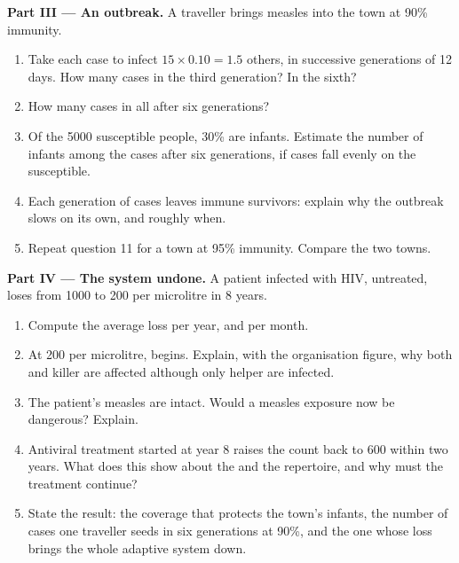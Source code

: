 \begin{problem}
\medskip
\noindent\textbf{Part III --- An outbreak.}
A traveller brings measles into the town at 90\% immunity.
\begin{enumerate}[resume]
  \item Take each case to infect $15 \times 0.10 = 1.5$ others, in
        successive generations of 12 days. How many cases in the
        third generation? In the sixth?
  \item How many cases in all after six generations?
  \item Of the 5000 susceptible people, 30\% are infants. Estimate the
        number of infants among the cases after six generations, if
        cases fall evenly on the susceptible.
  \item Each generation of cases leaves immune survivors: explain why
        the outbreak slows on its own, and roughly when.
  \item Repeat question 11 for a town at 95\% immunity. Compare the
        two towns.
\end{enumerate}

\medskip
\noindent\textbf{Part IV --- The system undone.}
A patient infected with HIV, untreated, loses  from
1000 to 200 per microlitre in 8 years.
\begin{enumerate}[resume]
  \item Compute the average loss per year, and per month.
  \item At 200 per microlitre,  begins. Explain, with the
        organisation figure, why both  and killer  are
        affected although only helper  are infected.
  \item The patient's measles  are intact. Would a measles
        exposure now be dangerous? Explain.
  \item Antiviral treatment started at year 8 raises the count back to
        600 within two years. What does this show about the  and the repertoire, and why must the treatment continue?
  \item State the result: the coverage that protects the town's
        infants, the number of cases one traveller seeds in six
        generations at 90\%, and the one  whose loss brings the
        whole adaptive system down.
\end{enumerate}
\end{problem}
